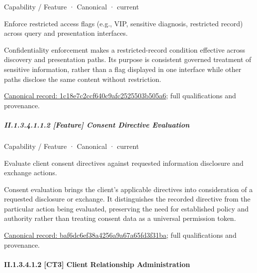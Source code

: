 \label{element:1c18e7c2ccf640c9afc2525503b505a6}
{\small Capability / Feature · Canonical · current}\par

Enforce restricted access flags (e.g., VIP, sensitive diagnosis, restricted record) across query and presentation interfaces.



Confidentiality enforcement makes a restricted-record condition effective across discovery and presentation paths. Its purpose is consistent governed treatment of sensitive information, rather than a flag displayed in one interface while other paths disclose the same content without restriction.


{\footnotesize \href{../../../../../../../continuum/strategy/capability/feature/1c18e7c2ccf640c9afc2525503b505a6.md}{Canonical record: 1c18e7c2ccf640c9afc2525503b505a6}; full qualifications and provenance.}\par
\subparagraph*{II.1.3.4.1.1.2 [Feature] Consent Directive Evaluation}
\label{navigation:II.1.3.4.1.1.2}

\label{element:baf6dc6ef38a4256a9a67a65fd3f31ba}
{\small Capability / Feature · Canonical · current}\par

Evaluate client consent directives against requested information disclosure and exchange actions.



Consent evaluation brings the client's applicable directives into consideration of a requested disclosure or exchange. It distinguishes the recorded directive from the particular action being evaluated, preserving the need for established policy and authority rather than treating consent data as a universal permission token.


{\footnotesize \href{../../../../../../../continuum/strategy/capability/feature/baf6dc6ef38a4256a9a67a65fd3f31ba.md}{Canonical record: baf6dc6ef38a4256a9a67a65fd3f31ba}; full qualifications and provenance.}\par
\paragraph*{II.1.3.4.1.2 [CT3] Client Relationship Administration}
\label{navigation:II.1.3.4.1.2}

